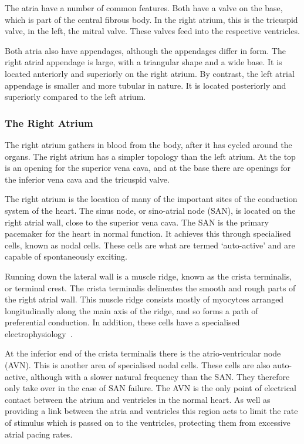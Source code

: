 The atria have a number of common features.
Both have a valve on the base, which is part of the central fibrous body.
In the right atrium, this is the tricuspid valve, in the left, the mitral valve.
These valves feed into the respective ventricles.

Both atria also have appendages, although the appendages differ in form.
The right atrial appendage is large, with a triangular shape and a wide base.
It is located anteriorly and superiorly on the right atrium.
By contrast, the left atrial appendage is smaller and more tubular in nature.
It is located posteriorly and superiorly compared to the left atrium.

\subsubsection{The Right Atrium}

The right atrium gathers in blood from the body, after it has cycled around the
organs.
The right atrium has a simpler topology than the left atrium.
At the top is an opening for the superior vena cava, and at the base there are
openings for the inferior vena cava and the tricuspid valve.

The right atrium is the location of many of the important sites of the
conduction system of the heart.
The sinus node, or sino-atrial node (SAN), is located on the right atrial wall,
close to the superior vena cava.
The SAN is the primary pacemaker for the heart in normal function.
It achieves this through specialised cells, known as nodal cells.
These cells are what are termed `auto-active' and are capable of spontaneously
exciting.

Running down the lateral wall is a muscle ridge, known as the crista terminalis,
or terminal crest.
The crista terminalis delineates the smooth and rough parts of the right atrial
wall.
This muscle ridge consists mostly of myocytces arranged longitudinally along the
main axis of the ridge, and so forms a path of preferential conduction.
In addition, these cells have a specialised electrophysiology~\cite{Feng1998}.

At the inferior end of the crista terminalis there is the atrio-ventricular
node (AVN).
This is another area of specialised nodal cells.
These cells are also auto-active, although with a slower natural frequency than
the SAN.
They therefore only take over in the case of SAN failure.
The AVN is the only point of electrical contact between the atrium and
ventricles in the normal heart.
As well as providing a link between the atria and ventricles this region acts
to limit the rate of stimulus which is passed on to the ventricles, protecting
them from excessive atrial pacing rates.

